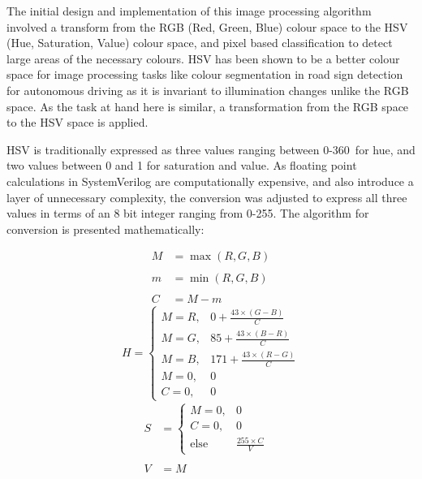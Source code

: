 \documentclass[a4paper]{article}
\begin{document}


The initial design and implementation of this image processing algorithm involved
a transform from the RGB (Red, Green, Blue) colour space to the HSV (Hue, 
Saturation, Value) colour space, and pixel based classification to detect large
areas of the necessary colours.  HSV has been shown to be a better colour space
for image processing tasks like colour segmentation in road sign detection for 
autonomous driving as it is invariant to illumination changes unlike the RGB 
space.\cite{ali2013performance} As the task at hand here is similar, a transformation
from the RGB space to the HSV space is applied. 

HSV is traditionally expressed as three values ranging between 0-360\degree\  
for hue, and two values between 0 and 1 for saturation and value.\cite{10.1145/965139.807361}
As floating point calculations in SystemVerilog are computationally expensive, 
and also introduce a layer of unnecessary complexity, the conversion was adjusted
to express all three values in terms of an 8 bit integer ranging from 0-255. The
algorithm for conversion is presented mathematically:

\begin{multicols}{3}
    \noindent
    \begin{align*}
        M &= \max(R, G, B) \\ \\
        m &= \min(R, G, B) \\ \\
        C &= M-m 
    \end{align*}
    \begin{equation*}
        H = \begin{cases}
            M = R, & 0 + \frac{43 \times (G-B)}{C} \\
            M = G, & 85 + \frac{43 \times (B-R)}{C} \\
            M = B, & 171 + \frac{43 \times (R-G)}{C} \\
            M = 0, & 0 \\
            C = 0, & 0
        \end{cases} 
    \end{equation*}
    \begin{align*}
        S &= \begin{cases}
            M = 0, & 0 \\ C = 0, & 0 \\ \text{else} & \frac{255\times C}{V}
        \end{cases} & \\ \\
         V &= M  
    \end{align*}
\end{multicols}
\end{document}
